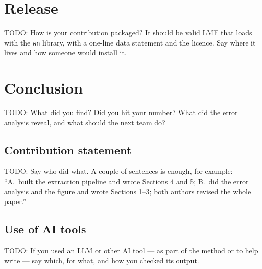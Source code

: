 \documentclass[a4paper,12pt]{article}
\begin{document}
\section{Release}

TODO: How is your contribution packaged?  It should be valid LMF that
loads with the \texttt{wn} library, with a one-line data statement and
the licence.  Say where it lives and how someone would install it.

\section{Conclusion}

TODO: What did you find?  Did you hit your number?  What did the error
analysis reveal, and what should the next team do?

\subsection*{Contribution statement}

TODO: Say who did what.  A couple of sentences is enough, for example:
``A.\ built the extraction pipeline and wrote Sections 4 and 5;
B.\ did the error analysis and the figure and wrote Sections 1--3;
both authors revised the whole paper.''

\subsection*{Use of AI tools}

TODO: If you used an LLM or other AI tool --- as part of the method or
to help write --- say which, for what, and how you checked its output.



\end{document}
